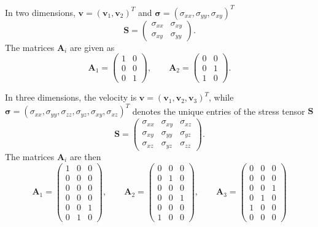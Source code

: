 \documentclass{siamart0216}
\newcommand{\LRp}[1]{\left( #1 \right)}
\begin{document}
In two dimensions, $\bm{v} = (\bm{v}_1, \bm{v}_2)^T$ and $\bm{\sigma}= (\sigma_{xx},\sigma_{yy},\sigma_{xy})^T$ 
\[
\bm{S} = \LRp{\begin{array}{cc}
\sigma_{xx} & \sigma_{xy}\\
\sigma_{xy} & \sigma_{yy}
\end{array}}.
\]
The matrices $\bm{A}_i$ are given as
\[
\bm{A}_1 = \left(\begin{array}{cc}
1 & 0\\
0 & 0\\
0 & 1
\end{array}\right), \qquad 
\bm{A}_2 = \left(\begin{array}{cc}
0 & 0\\
0 & 1\\
1 & 0
\end{array}\right).
\]

In three dimensions, the velocity is $\bm{v} = (\bm{v}_1,\bm{v}_2,\bm{v}_3)^T$, while $\bm{\sigma}= (\sigma_{xx},\sigma_{yy},\sigma_{zz},\sigma_{yz},\sigma_{xy},\sigma_{xz})^T$ denotes the unique entries of the stress tensor $\bm{S}$
\[
\bm{S} = \LRp{\begin{array}{ccc}
\sigma_{xx} & \sigma_{xy} & \sigma_{xz}\\
\sigma_{xy} & \sigma_{yy}& \sigma_{yz}\\
\sigma_{xz} & \sigma_{yz}& \sigma_{zz}
\end{array}}.
\]
The matrices $\bm{A}_i$ are then
\[
\bm{A}_1 = \left(\begin{array}{ccc}
1 & 0 & 0\\
0 & 0& 0\\
0 & 0& 0\\
0 & 0& 0\\
0 & 0 & 1\\
0 & 1 & 0
\end{array}\right), \qquad 
\bm{A}_2 = \left(\begin{array}{ccc}
0 & 0 & 0\\
0 & 1 & 0\\
0 & 0 & 0\\
0 & 0 & 1\\
0 & 0 & 0\\
1 & 0 & 0
\end{array}\right), \qquad
\bm{A}_3 = \left(\begin{array}{ccc}
0 & 0 & 0\\
0 & 0 & 0\\
0 & 0 & 1\\
0 & 1 & 0\\
1 & 0 & 0\\
0 & 0 & 0
\end{array}\right)
\]
\end{document}
